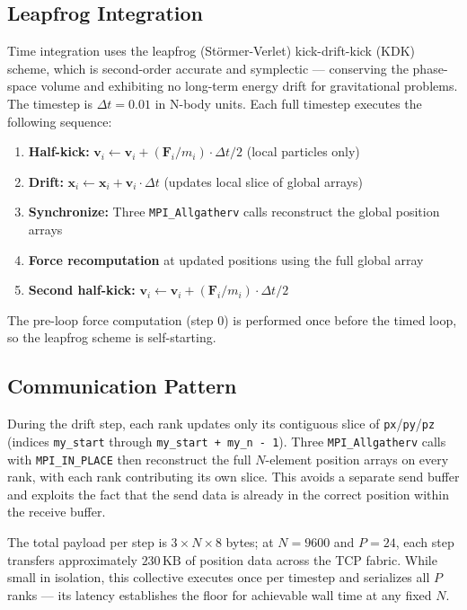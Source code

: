 \documentclass[11pt]{article}
\begin{document}
\subsection{Leapfrog Integration}

Time integration uses the leapfrog (Störmer-Verlet) kick-drift-kick (KDK) scheme, which is second-order accurate and symplectic — conserving the phase-space volume and exhibiting no long-term energy drift for gravitational problems. The timestep is $\Delta t = 0.01$ in N-body units. Each full timestep executes the following sequence:

\begin{enumerate}
  \item \textbf{Half-kick:} $\mathbf{v}_i \leftarrow \mathbf{v}_i + (\mathbf{F}_i / m_i) \cdot \Delta t / 2$ \quad (local particles only)
  \item \textbf{Drift:} $\mathbf{x}_i \leftarrow \mathbf{x}_i + \mathbf{v}_i \cdot \Delta t$ \quad (updates local slice of global arrays)
  \item \textbf{Synchronize:} Three \texttt{MPI\_Allgatherv} calls reconstruct the global position arrays
  \item \textbf{Force recomputation} at updated positions using the full global array
  \item \textbf{Second half-kick:} $\mathbf{v}_i \leftarrow \mathbf{v}_i + (\mathbf{F}_i / m_i) \cdot \Delta t / 2$
\end{enumerate}

The pre-loop force computation (step 0) is performed once before the timed loop, so the leapfrog scheme is self-starting.

\subsection{Communication Pattern}

During the drift step, each rank updates only its contiguous slice of \texttt{px}/\texttt{py}/\texttt{pz} (indices \texttt{my\_start} through \texttt{my\_start + my\_n - 1}). Three \texttt{MPI\_Allgatherv} calls with \texttt{MPI\_IN\_PLACE} then reconstruct the full $N$-element position arrays on every rank, with each rank contributing its own slice. This avoids a separate send buffer and exploits the fact that the send data is already in the correct position within the receive buffer.

The total payload per step is $3 \times N \times 8$ bytes; at $N = 9600$ and $P = 24$, each step transfers approximately $230\,\text{KB}$ of position data across the TCP fabric. While small in isolation, this collective executes once per timestep and serializes all $P$ ranks — its latency establishes the floor for achievable wall time at any fixed $N$.
\end{document}
